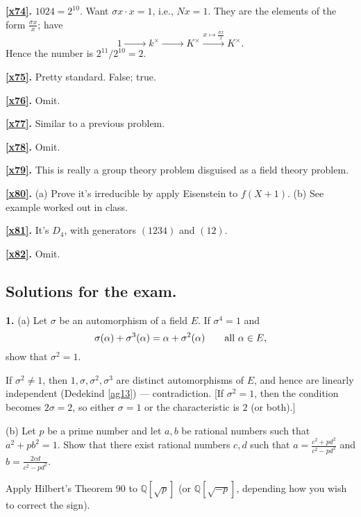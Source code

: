\documentclass[a4paper,11pt,final,openany]{memoir}
\theoremstyle{nonumberplain}
\begin{document}
\medskip\noindent\textbf{\ref{x74}.} $1024=2^{10}$. Want $\sigma x\cdot x=1$,
i.e., $Nx=1$. They are the elements of the form $\frac{\sigma x}{x}$; have
\[
1\xrightarrow{\phantom{x\mapsto\frac {\sigma x}x}}k^{\times}%
\xrightarrow{\phantom{x\mapsto\frac {\sigma x}x}}K^{\times}%
\xrightarrow{x\mapsto\frac {\sigma x}x}K^{\times} .
\]
Hence the number is $2^{11}/2^{10}=2$.

\medskip\noindent\textbf{\ref{x75}.} Pretty standard. False; true.

\medskip\noindent\textbf{\ref{x76}.} Omit.

\medskip\noindent\textbf{\ref{x77}.} Similar to a previous problem.

\medskip\noindent\textbf{\ref{x78}.} Omit.

\medskip\noindent\textbf{\ref{x79}.} This is really a group theory problem
disguised as a field theory problem.

\medskip\noindent\textbf{\ref{x80}.} (a) Prove it's irreducible by apply
Eisenstein to $f(X+1)$. (b) See example worked out in class.

\medskip\noindent\textbf{\ref{x81}.} It's $D_{4}$, with generators $(1234)$
and $(12)$.

\medskip\noindent\textbf{\ref{x82}.} Omit.

\subsection{Solutions for the exam.}

\medskip\noindent\textbf{1.} (a) Let $\sigma$ be an automorphism of a field
$E$. If $\sigma^{4}=1$ and
\[
\sigma(\alpha)+\sigma^{3}(\alpha)=\alpha+\sigma^{2}(\alpha)\qquad
\text{\textrm{all }} \alpha\in E,
\]
show that $\sigma^{2}=1$.

If $\sigma^{2}\neq1$, then $1,\sigma,\sigma^{2},\sigma^{3}$ are distinct
automorphisms of $E$, and hence are linearly independent (Dedekind \ref{ag13})
--- contradiction. [If $\sigma^{2}=1$, then the condition becomes $2\sigma=2$,
so either $\sigma=1$ or the characteristic is $2$ (or both).]

\noindent(b) Let $p$ be a prime number and let $a,b$ be rational numbers such
that $a^{2}+pb^{2}=1$. Show that there exist rational numbers $c,d$ such that
$a=\frac{c^{2}+pd^{2}}{c^{2}-pd^{2}}$ and $b=\frac{2cd}{ c^{2}-pd^{2}}$.

Apply Hilbert's Theorem 90 to ${\mathbb{Q}}[\sqrt p]$ (or ${\mathbb{Q}}[\sqrt{
-p}]$, depending how you wish to correct the sign). \bigskip
\end{document}
